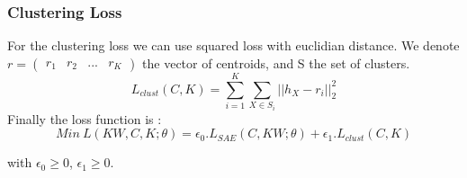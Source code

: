 \subsubsection{Clustering Loss}

For the clustering loss we can use squared loss with euclidian distance. We
denote $r = \begin{pmatrix} r_1 & r_2 & ... & r_K\end{pmatrix}$ the vector of
centroids, and S the set of clusters.  
\begin{equation}\label{eq:loss_clust}
  L_{clust}(C,K) = \sum_{i=1}^K \sum_{X \in S_i} ||h_X - r_i ||_2^2 
\end{equation}
Finally the loss function is :
\begin{equation}\label{eq:loss_FINALE}
  Min~L(KW, C, K; \theta) = \epsilon_0.L_{SAE}(C, KW; \theta) 
  + \epsilon_1.L_{clust}(C,K)
\end{equation}

with $\epsilon_0 \geq 0$, $\epsilon_1 \geq 0$.

